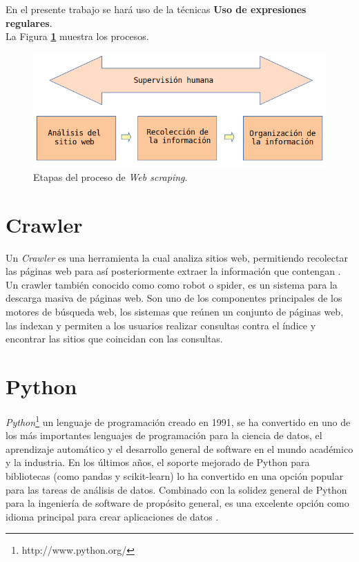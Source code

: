 En el presente trabajo se hará uso de la técnicas \textbf{Uso de expresiones regulares}.\\
La Figura \textbf{\ref{fig:procesos}} muestra los procesos.

\begin{figure}[H]
    \centering
    \includegraphics[scale=.35]{imagenes/Capitulo3/procesos}
    \caption{Etapas del proceso de \textit{Web scraping}.}
    \label{fig:procesos}
  \end{figure}
  

\section{Crawler}
Un \textit{Crawler}  es una herramienta la cual analiza sitios web, permitiendo recolectar 
las páginas web para así posteriormente extraer la información que contengan \citep{CTCrawler}. Un crawler también 
conocido como como robot o spider, es un sistema para la descarga masiva de páginas web. Son uno de 
los componentes principales de los motores de búsqueda web, los sistemas que reúnen un conjunto de 
páginas web, las indexan y permiten a los usuarios realizar consultas contra el índice y encontrar las 
sitios que coincidan con las consultas.


\section{Python}
\textit{Python}\footnote{http://www.python.org/} un lenguaje de programación creado en 1991, se ha convertido en uno de los más 
importantes lenguajes de programación para la ciencia de datos, el aprendizaje automático y el desarrollo general de software en 
el mundo académico y la industria. 
En los últimos años, el soporte mejorado de Python para bibliotecas (como pandas y scikit-learn) lo ha convertido en una opción popular 
para las tareas de análisis de datos. Combinado con la solidez general de Python para la ingeniería de software de propósito general, 
es una excelente opción como idioma principal para crear aplicaciones de datos \citep{CTPython}.

